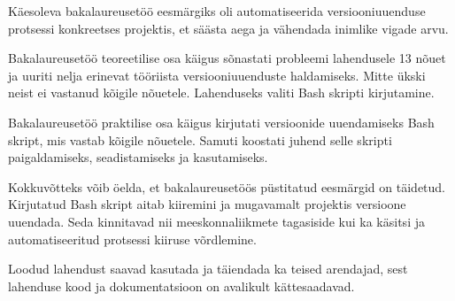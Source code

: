 \documentclass[12pt]{article}
\begin{document}
  Käesoleva bakalaureusetöö eesmärgiks oli automatiseerida versiooniuuenduse protsessi konkreetses projektis, et säästa aega ja vähendada inimlike vigade arvu.
  
  Bakalaureusetöö teoreetilise osa käigus sõnastati probleemi lahendusele 13 nõuet ja uuriti nelja erinevat tööriista versiooniuuenduste haldamiseks. Mitte ükski neist ei vastanud kõigile nõuetele. Lahenduseks valiti Bash skripti kirjutamine.
  
  Bakalaureusetöö praktilise osa käigus kirjutati versioonide uuendamiseks Bash skript, mis vastab kõigile nõuetele. Samuti koostati juhend selle skripti paigaldamiseks, seadistamiseks ja kasutamiseks.
  
  Kokkuvõtteks võib öelda, et bakalaureusetöös püstitatud eesmärgid on täidetud. Kirjutatud Bash skript aitab kiiremini ja mugavamalt projektis versioone uuendada. Seda kinnitavad nii meeskonnaliikmete tagasiside kui ka käsitsi ja automatiseeritud protsessi kiiruse võrdlemine.
  
  Loodud lahendust saavad kasutada ja täiendada ka teised arendajad, sest lahenduse kood ja dokumentatsioon on avalikult kättesaadavad.

  \newpage
  
\end{document}
